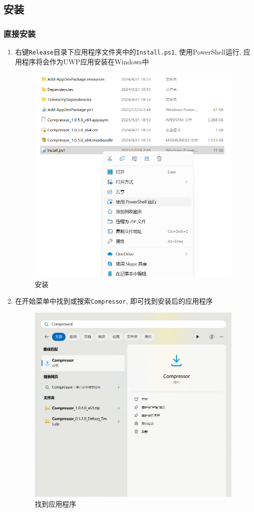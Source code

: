 \documentclass{article}
\begin{document}
\subsection{安装}

\subsubsection{直接安装}
\begin{enumerate}
    \item 右键\texttt{Release}目录下应用程序文件夹中的\texttt{Install.ps1}, 使用PowerShell运行, 应用程序将会作为UWP应用安装在Windows中
    \begin{figure}[H]
        \centering
        \includegraphics[width=0.6\linewidth]{assets/install.png}
        \caption{安装}
    \end{figure}
    \item 在开始菜单中找到或搜索\texttt{Compressor}, 即可找到安装后的应用程序
    \begin{figure}[H]
        \centering
        \includegraphics[width=0.6\linewidth]{assets/image.png}
        \caption{找到应用程序}
    \end{figure}
\end{enumerate}
\end{document}
